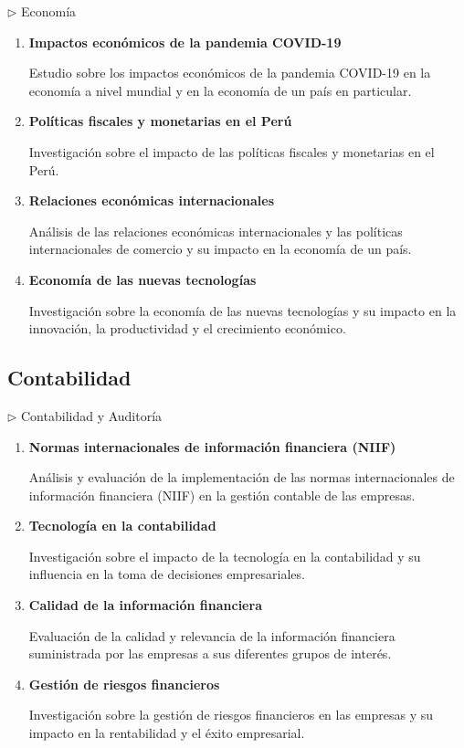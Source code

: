 \documentclass[12pt,a4paper]{article}
\begin{document}
\begin{careerbox}{$\triangleright$ Economía}
	\begin{enumerate}
		\item \textbf{Impactos económicos de la pandemia COVID-19}
		
		Estudio sobre los impactos económicos de la pandemia COVID-19 en la economía a nivel mundial y en la economía de un país en particular.
		
		\item \textbf{Políticas fiscales y monetarias en el Perú}
		
		Investigación sobre el impacto de las políticas fiscales y monetarias en el Perú.
		
		\item \textbf{Relaciones económicas internacionales}
		
		Análisis de las relaciones económicas internacionales y las políticas internacionales de comercio y su impacto en la economía de un país.
		
		\item \textbf{Economía de las nuevas tecnologías}
		
		Investigación sobre la economía de las nuevas tecnologías y su impacto en la innovación, la productividad y el crecimiento económico.
	\end{enumerate}
\end{careerbox}

\subsection{Contabilidad}

\begin{careerbox}{$\triangleright$ Contabilidad y Auditoría}
	\begin{enumerate}
		\item \textbf{Normas internacionales de información financiera (NIIF)}
		
		Análisis y evaluación de la implementación de las normas internacionales de información financiera (NIIF) en la gestión contable de las empresas.
		
		\item \textbf{Tecnología en la contabilidad}
		
		Investigación sobre el impacto de la tecnología en la contabilidad y su influencia en la toma de decisiones empresariales.
		
		\item \textbf{Calidad de la información financiera}
		
		Evaluación de la calidad y relevancia de la información financiera suministrada por las empresas a sus diferentes grupos de interés.
		
		\item \textbf{Gestión de riesgos financieros}
		
		Investigación sobre la gestión de riesgos financieros en las empresas y su impacto en la rentabilidad y el éxito empresarial.
	\end{enumerate}
\end{careerbox}
\end{document}
